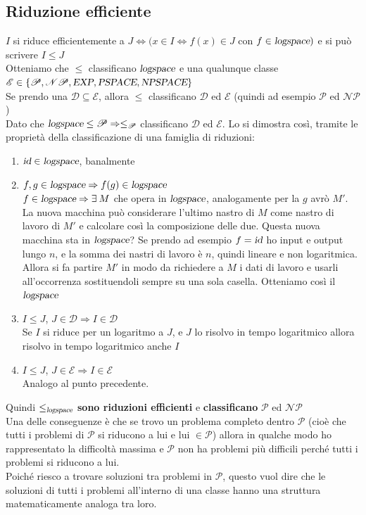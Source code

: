 \documentclass[10pt]{book}
\begin{document}
\subsection{Riduzione efficiente}
$I$ si riduce efficientemente a $J \Leftrightarrow (x\in I \Leftrightarrow f(x)\in J$ con $f \in \textsl{logspace})$ e si può scrivere $I \leq J$\\
Otteniamo che $\leq$ classificano $\textsl{logspace}$ e una qualunque classe $\mathscr{E} \in \{\mathscr{P}, \mathscr{NP}, \textsl{EXP}, \textsl{PSPACE}, \textsl{NPSPACE}\}$\\
Se prendo una $\mathscr{D} \subseteq \mathscr{E}$, allora $\leq$ classificano $\mathscr{D}$ ed $\mathscr{E}$ (quindi ad esempio $\mathscr{P}$ ed $\mathscr{NP}$)\\
Dato che $\textsl{logspace}\leq\mathscr{P} \Rightarrow \leq_\mathscr{P}$ classificano $\mathscr{D}$ ed $\mathscr{E}$. Lo si dimostra così, tramite le proprietà della classificazione di una famiglia di riduzioni:
\begin{enumerate}
	\item $\textsl{id} \in \textsl{logspace}$, banalmente
	\item $f, g \in \textsl{logspace} \Rightarrow f(g)\in \textsl{logspace}$\\
	$f \in \textsl{logspace} \Rightarrow \exists\:M$ che opera in $\textsl{logspace}$, analogamente per la $g$ avrò $M'$. La nuova macchina può considerare l'ultimo nastro di $M$ come nastro di lavoro di $M'$ e calcolare così la composizione delle due. Questa nuova macchina sta in $\textsl{logspace}$? Se prendo ad esempio $f = \textsl{id}$ ho input e output lungo $n$, e la somma dei nastri di lavoro è $n$, quindi lineare e non logaritmica. Allora si fa partire $M'$ in modo da richiedere a $M$ i dati di lavoro e usarli all'occorrenza sostituendoli sempre su una sola casella. Otteniamo così il $\textsl{logspace}$
	\item $I\leq J$, $J \in \mathscr{D} \Rightarrow I \in \mathscr{D}$\\
	Se $I$ si riduce per un logaritmo a $J$, e $J$ lo risolvo in tempo logaritmico allora risolvo in tempo logaritmico anche $I$
	\item $I\leq J$, $J \in \mathscr{E} \Rightarrow I \in \mathscr{E}$\\
	Analogo al punto precedente.
\end{enumerate}
Quindi $\leq_{\textsl{logspace}}$ \textbf{sono riduzioni efficienti} e \textbf{classificano} $\mathscr{P}$ ed $\mathscr{NP}$\\
Una delle conseguenze è che se trovo un problema completo dentro $\mathscr{P}$ (cioè che tutti i problemi di $\mathscr{P}$ si riducono a lui e lui $\in\mathscr{P}$) allora in qualche modo ho rappresentato la difficoltà massima e $\mathscr{P}$ non ha problemi più difficili perché tutti i problemi si riducono a lui.\\
Poiché riesco a trovare soluzioni tra problemi in $\mathscr{P}$, questo vuol dire che le soluzioni di tutti i problemi all'interno di una classe hanno una struttura matematicamente analoga tra loro.
\end{document}
